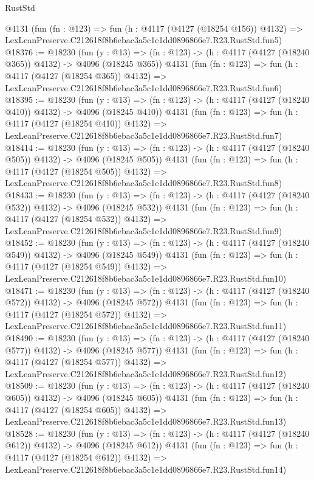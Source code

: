 \begin{lexlean}{RustStd}
\begin{coremodule}
    @4131
    (fun (fn : @123) =>
    fun (h : @4117 (@4127 (@18254 @156)) @4132) =>
    LexLeanPreserve.C212618f8b6ebac3a5c1e1dd0896866e7.R23.RustStd.fun5)
@18376 := @18230
    (fun (y : @13) => (fn : @123) -> (h : @4117 (@4127 (@18240 @365)) @4132) -> @4096 (@18245 @365))
    @4131
    (fun (fn : @123) =>
    fun (h : @4117 (@4127 (@18254 @365)) @4132) =>
    LexLeanPreserve.C212618f8b6ebac3a5c1e1dd0896866e7.R23.RustStd.fun6)
@18395 := @18230
    (fun (y : @13) => (fn : @123) -> (h : @4117 (@4127 (@18240 @410)) @4132) -> @4096 (@18245 @410))
    @4131
    (fun (fn : @123) =>
    fun (h : @4117 (@4127 (@18254 @410)) @4132) =>
    LexLeanPreserve.C212618f8b6ebac3a5c1e1dd0896866e7.R23.RustStd.fun7)
@18414 := @18230
    (fun (y : @13) => (fn : @123) -> (h : @4117 (@4127 (@18240 @505)) @4132) -> @4096 (@18245 @505))
    @4131
    (fun (fn : @123) =>
    fun (h : @4117 (@4127 (@18254 @505)) @4132) =>
    LexLeanPreserve.C212618f8b6ebac3a5c1e1dd0896866e7.R23.RustStd.fun8)
@18433 := @18230
    (fun (y : @13) => (fn : @123) -> (h : @4117 (@4127 (@18240 @532)) @4132) -> @4096 (@18245 @532))
    @4131
    (fun (fn : @123) =>
    fun (h : @4117 (@4127 (@18254 @532)) @4132) =>
    LexLeanPreserve.C212618f8b6ebac3a5c1e1dd0896866e7.R23.RustStd.fun9)
@18452 := @18230
    (fun (y : @13) => (fn : @123) -> (h : @4117 (@4127 (@18240 @549)) @4132) -> @4096 (@18245 @549))
    @4131
    (fun (fn : @123) =>
    fun (h : @4117 (@4127 (@18254 @549)) @4132) =>
    LexLeanPreserve.C212618f8b6ebac3a5c1e1dd0896866e7.R23.RustStd.fun10)
@18471 := @18230
    (fun (y : @13) => (fn : @123) -> (h : @4117 (@4127 (@18240 @572)) @4132) -> @4096 (@18245 @572))
    @4131
    (fun (fn : @123) =>
    fun (h : @4117 (@4127 (@18254 @572)) @4132) =>
    LexLeanPreserve.C212618f8b6ebac3a5c1e1dd0896866e7.R23.RustStd.fun11)
@18490 := @18230
    (fun (y : @13) => (fn : @123) -> (h : @4117 (@4127 (@18240 @577)) @4132) -> @4096 (@18245 @577))
    @4131
    (fun (fn : @123) =>
    fun (h : @4117 (@4127 (@18254 @577)) @4132) =>
    LexLeanPreserve.C212618f8b6ebac3a5c1e1dd0896866e7.R23.RustStd.fun12)
@18509 := @18230
    (fun (y : @13) => (fn : @123) -> (h : @4117 (@4127 (@18240 @605)) @4132) -> @4096 (@18245 @605))
    @4131
    (fun (fn : @123) =>
    fun (h : @4117 (@4127 (@18254 @605)) @4132) =>
    LexLeanPreserve.C212618f8b6ebac3a5c1e1dd0896866e7.R23.RustStd.fun13)
@18528 := @18230
    (fun (y : @13) => (fn : @123) -> (h : @4117 (@4127 (@18240 @612)) @4132) -> @4096 (@18245 @612))
    @4131
    (fun (fn : @123) =>
    fun (h : @4117 (@4127 (@18254 @612)) @4132) =>
    LexLeanPreserve.C212618f8b6ebac3a5c1e1dd0896866e7.R23.RustStd.fun14)

\end{coremodule}
\end{lexlean}
